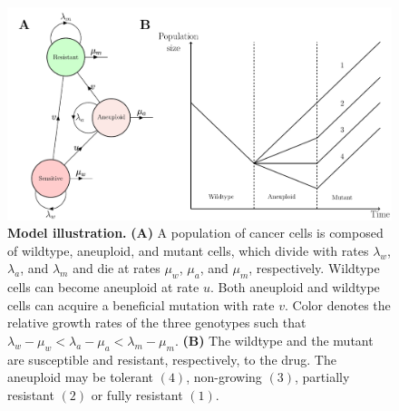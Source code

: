 \documentclass[12pt]{extarticle}
\begin{document}
\begin{figure}
\centering
\includegraphics[width=\textwidth]{Figures/figureAneuploidy.pdf}
\caption{
\textbf{Model illustration.}
\textbf{(A)} A population of cancer cells is composed of wildtype, aneuploid, and mutant cells, which divide with rates $\lambda_w$, $\lambda_a$, and $\lambda_m$ and die at rates $\mu_w$, $\mu_a$, and $\mu_m$, respectively. 
Wildtype cells can become aneuploid at rate $u$. Both aneuploid and wildtype cells can acquire a beneficial mutation with rate $v$. Color denotes the relative growth rates of the three genotypes such that $\lambda_w - \mu_w < \lambda_a - \mu_a < \lambda_m - \mu_m$. \textbf{(B)} The wildtype and the mutant are susceptible and resistant, respectively, to the drug. The aneuploid may be tolerant $(4)$, non-growing $(3)$, partially resistant $(2)$ or fully resistant $(1)$.
}
\label{figureAneuploidy}
\end{figure}

\end{document}
